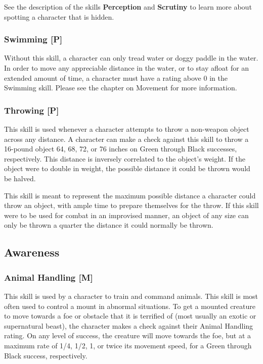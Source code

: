 \documentclass[oneside]{book}
\begin{document}
\begin{multicols}{2}
See the description of the skills \textbf{Perception} and \textbf{Scrutiny} to learn more about spotting a character that is hidden. 

\subsubsection{Swimming [P]}
Without this skill, a character can only tread water or doggy paddle in the water. In order to move any appreciable distance in the water, or to stay afloat for an extended amount of time, a character must have a rating above 0 in the Swimming skill. Please see the chapter on Movement for more information.

\subsubsection{Throwing [P]}
This skill is used whenever a character attempts to throw a non-weapon object across any distance. A character can make a check against this skill to throw a 16-pound object 64, 68, 72, or 76 inches on Green through Black successes, respectively. This distance is inversely correlated to the object's weight. If the object were to double in weight, the possible distance it could be thrown would be halved. 

This skill is meant to represent the maximum possible distance a character could throw an object, with ample time to prepare themselves for the throw. If this skill were to be used for combat in an improvised manner, an object of any size can only be thrown a quarter the distance it could normally be thrown.

\subsection{Awareness}
\subsubsection{Animal Handling [M]}
This skill is used by a character to train and command animals. This skill is most often used to control a mount in abnormal situations. To get a mounted creature to move towards a foe or obstacle that it is terrified of (most usually an exotic or supernatural beast), the character makes a check against their Animal Handling rating. On any level of success, the creature will move towards the foe, but at a maximum rate of 1/4, 1/2, 1, or twice its movement speed, for a Green through Black success, respectively.


\end{multicols}
\end{document}
